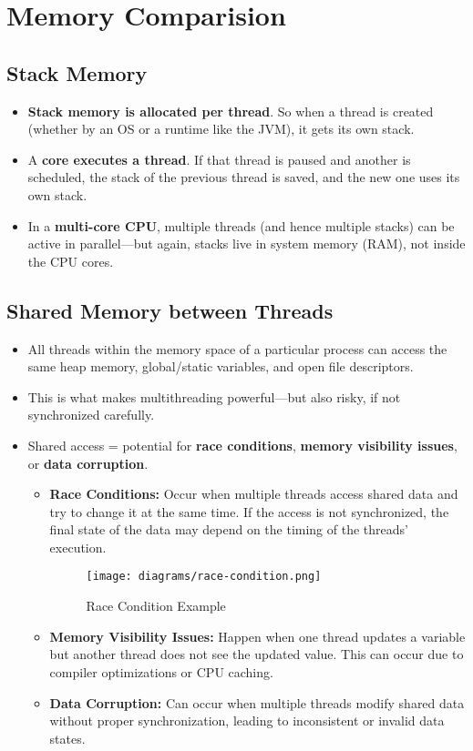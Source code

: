 \documentclass{article}
\begin{document}
\section{Memory Comparision}
\subsection{Stack Memory}
\begin{itemize}
  \item \textbf{Stack memory is allocated per thread}. So when a thread is created (whether by an OS or a runtime like the JVM), it gets its own stack.
  \item A \textbf{core executes a thread}. If that thread is paused and another is scheduled, the stack of the previous thread is saved, and the new one uses its own stack.
  \item In a \textbf{multi-core CPU}, multiple threads (and hence multiple stacks) can be active in parallel—but again, stacks live in system memory (RAM), not inside the CPU cores.
\end{itemize}
\subsection{Shared Memory between Threads}
\begin{itemize}
  \item All threads within the memory space of a particular process can access the same heap memory, global/static variables, and open file descriptors.
  \item This is what makes multithreading powerful—but also risky, if not synchronized carefully.
  \item Shared access = potential for \textbf{race conditions}, \textbf{memory visibility issues}, or \textbf{data corruption}.
  \begin{itemize}
    \item \textbf{Race Conditions:} Occur when multiple threads access shared data and try to change it at the same time. If the access is not synchronized, the final state of the data may depend on the timing of the threads' execution.
    \begin{figure}[h]
      \centering
      \texttt{[image: diagrams/race-condition.png]}
      \caption{Race Condition Example}\label{fig:race_condition}
    \end{figure}
    \item \textbf{Memory Visibility Issues:} Happen when one thread updates a variable but another thread does not see the updated value. This can occur due to compiler optimizations or CPU caching.
    \item \textbf{Data Corruption:} Can occur when multiple threads modify shared data without proper synchronization, leading to inconsistent or invalid data states.
  \end{itemize}
\end{itemize}
\end{document}
